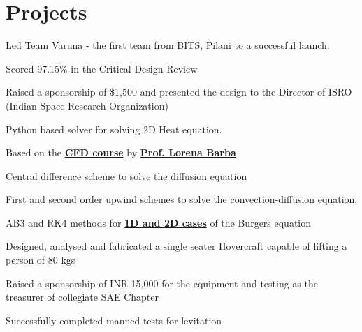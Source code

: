 \documentclass[]{resume}
\begin{document}
\begin{minipage}[t]{0.66\textwidth}
\section{Projects}
\begin{tightemize}
\item Led Team Varuna - the first team from BITS, Pilani to a successful launch.
\item Scored 97.15\% in the Critical Design Review
\item Raised a sponsorship of \$1,500 and presented the design to the Director of ISRO
(Indian Space Research Organization)
\end{tightemize}
\sectionsep

\begin{tightemize}
\item Python based solver for solving 2D Heat equation.
\item Based on the \textbf{\href{https://itunes.apple.com/us/itunes-u/computational-fluid-dynamics/id452560554?mt=10}
        {CFD course}} by \textbf{\href{http://lorenabarba.com}{Prof. Lorena Barba}}
\end{tightemize}
\begin{tightemize}
\item Central difference scheme to solve the diffusion equation
\item First and second order upwind schemes to solve the convection-diffusion equation.
\item AB3 and RK4 methods for \textbf{\href{https://github.com/sriramkswamy/CFDEGM6342.git}{1D and 2D cases}} of the Burgers equation
\end{tightemize}
\sectionsep

\begin{tightemize}
\item Designed, analysed and fabricated a single seater Hovercraft capable of lifting a person of 80 kgs
\item Raised a sponsorship of INR 15,000 for the equipment and testing as the treasurer of collegiate SAE Chapter
\item Successfully completed manned tests for levitation
\end{tightemize}
\sectionsep


\end{minipage}
\end{document}
